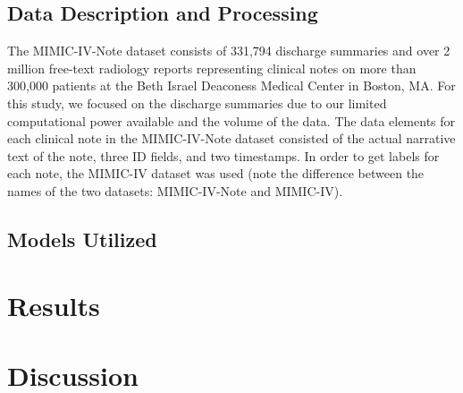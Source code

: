 \documentclass[manuscript,screen,review,nonacm]{acmart}
\begin{document}
\subsection{Data Description and Processing}
The MIMIC-IV-Note dataset consists of 331,794 discharge summaries and over 2 million free-text radiology reports representing clinical notes on more than 300,000 patients at the Beth Israel Deaconess Medical Center in Boston, MA. For this study, we focused on the discharge summaries due to our limited computational power available and the volume of the data. The data elements for each clinical note in the MIMIC-IV-Note dataset consisted of the actual narrative text of the note, three ID fields, and two timestamps\cite{dischnote}. In order to get labels for each note, the MIMIC-IV dataset\cite{johnson2023mimic} was used (note the difference between the names of the two datasets: MIMIC-IV-Note and MIMIC-IV).




\subsection{Models Utilized}

\section{Results}

\section{Discussion}




\end{document}
